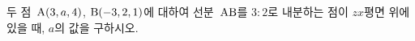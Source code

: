 두 점~$\mathrm{A}(3{,}\mkern3mu\mathopen{}a{,}\mkern3mu\mathopen{}4)$, $\mathrm{B}(-3{,}\mkern3mu\mathopen{}2{,}\mkern3mu\mathopen{}1)$에 대하여 선분~$\mathrm{AB}$를 $3:2$로 내분하는 점이 $zx$평면 위에 있을 때, $a$의 값을 구하시오.
